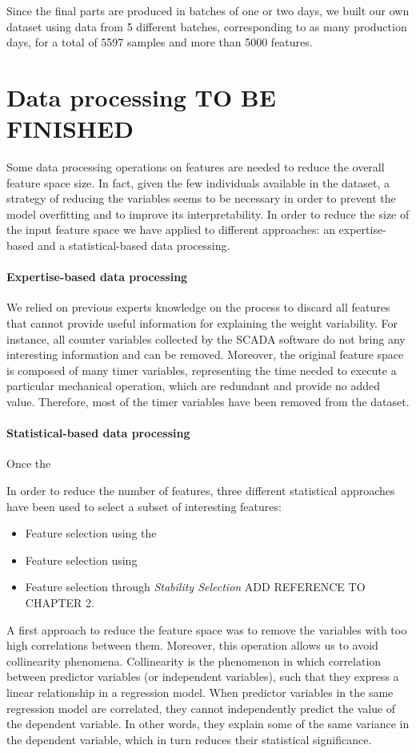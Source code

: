 Since the final parts are produced in batches of one or two days, we built our own dataset using data from 5 different batches, corresponding to as many production days, for a total of 5597 samples and more than 5000 features. 

\section{Data processing TO BE FINISHED}

Some data processing operations on features are needed to reduce the overall feature space size. In fact, given the few individuals available in the dataset, a strategy of reducing the variables seems to be necessary in order to prevent the model overfitting and to improve its interpretability. In order to reduce the size of the input feature space we have applied to different approaches: an expertise-based and a statistical-based data processing.

\paragraph{Expertise-based data processing}

We relied on previous experts knowledge on the process to discard all features that cannot provide useful information for explaining the weight variability. For instance, all counter variables collected by the SCADA software do not bring any interesting information and can be removed. Moreover, the original feature space is composed of many timer variables, representing the time needed to execute a particular mechanical operation, which are redundant and provide no added value. Therefore, most of the timer variables have been removed from the dataset.


\paragraph{Statistical-based data processing}

Once the 

In order to reduce the number of features, three different statistical approaches have been used to select a subset of interesting features:
\begin{itemize}
    \item Feature selection using the  
    \item Feature selection using 
    \item Feature selection through \textit{Stability Selection} ADD REFERENCE TO CHAPTER 2.
\end{itemize}
%
A first approach to reduce the feature space was to remove the variables with too high correlations between them. Moreover, this operation allows us to avoid collinearity phenomena. Collinearity is the phenomenon in which correlation between predictor variables (or independent variables), such that they express a linear relationship in a regression model. When predictor variables in the same regression model are correlated, they cannot independently predict the value of the dependent variable. In other words, they explain some of the same variance in the dependent variable, which in turn reduces their statistical significance.

